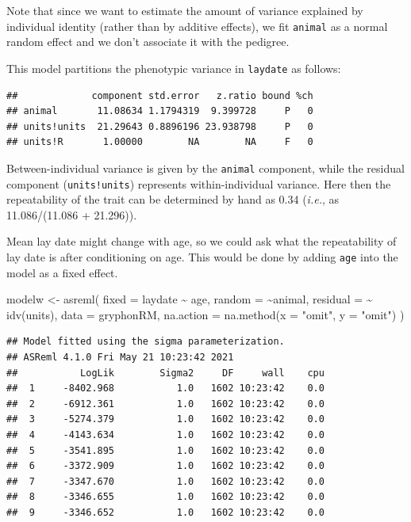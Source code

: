 \documentclass[
  12pt,
]{book}
\newenvironment{Shaded}{\begin{snugshade}}{\end{snugshade}}
\newcommand{\AttributeTok}[1]{\textcolor[rgb]{0.77,0.63,0.00}{#1}}
\newcommand{\FunctionTok}[1]{\textcolor[rgb]{0.00,0.00,0.00}{#1}}
\newcommand{\NormalTok}[1]{#1}
\newcommand{\OtherTok}[1]{\textcolor[rgb]{0.56,0.35,0.01}{#1}}
\newcommand{\SpecialCharTok}[1]{\textcolor[rgb]{0.00,0.00,0.00}{#1}}
\newcommand{\StringTok}[1]{\textcolor[rgb]{0.31,0.60,0.02}{#1}}
\begin{document}
Note that since we want to estimate the amount of variance explained by individual identity (rather than by additive effects), we fit \texttt{animal} as a normal random effect and we don't associate it with the pedigree.

This model partitions the phenotypic variance in \texttt{laydate} as follows:

\begin{Shaded}
\end{Shaded}

\begin{verbatim}
##             component std.error   z.ratio bound %ch
## animal       11.08634 1.1794319  9.399728     P   0
## units!units  21.29643 0.8896196 23.938798     P   0
## units!R       1.00000        NA        NA     F   0
\end{verbatim}

Between-individual variance is given by the \texttt{animal} component, while the residual component (\texttt{units!units}) represents within-individual variance. Here then the repeatability of the trait can be determined by hand as 0.34 (\emph{i.e.}, as 11.086/(11.086 + 21.296)).

Mean lay date might change with age, so we could ask what the repeatability of lay date is after conditioning on age. This would be done by adding \texttt{age} into the model as a fixed effect.

\begin{Shaded}
\begin{Highlighting}[]
\NormalTok{modelw }\OtherTok{\textless{}{-}} \FunctionTok{asreml}\NormalTok{(}
  \AttributeTok{fixed =}\NormalTok{ laydate }\SpecialCharTok{\textasciitilde{}}\NormalTok{ age,}
  \AttributeTok{random =} \SpecialCharTok{\textasciitilde{}}\NormalTok{animal,}
  \AttributeTok{residual =} \SpecialCharTok{\textasciitilde{}} \FunctionTok{idv}\NormalTok{(units),}
  \AttributeTok{data =}\NormalTok{ gryphonRM,}
  \AttributeTok{na.action =} \FunctionTok{na.method}\NormalTok{(}\AttributeTok{x =} \StringTok{"omit"}\NormalTok{, }\AttributeTok{y =} \StringTok{"omit"}\NormalTok{)}
\NormalTok{)}
\end{Highlighting}
\end{Shaded}

\begin{verbatim}
## Model fitted using the sigma parameterization.
## ASReml 4.1.0 Fri May 21 10:23:42 2021
##           LogLik        Sigma2     DF     wall    cpu
##  1     -8402.968           1.0   1602 10:23:42    0.0
##  2     -6912.361           1.0   1602 10:23:42    0.0
##  3     -5274.379           1.0   1602 10:23:42    0.0
##  4     -4143.634           1.0   1602 10:23:42    0.0
##  5     -3541.895           1.0   1602 10:23:42    0.0
##  6     -3372.909           1.0   1602 10:23:42    0.0
##  7     -3347.670           1.0   1602 10:23:42    0.0
##  8     -3346.655           1.0   1602 10:23:42    0.0
##  9     -3346.652           1.0   1602 10:23:42    0.0
\end{verbatim}
\end{document}
